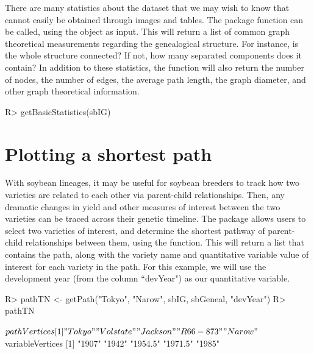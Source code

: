 \documentclass[article,shortnames]{jss}
\begin{document}
There are many statistics about the  dataset that we may wish to know that cannot easily be obtained through images and tables. The package function  can be called, using the  object as input. This will return a list of common graph theoretical measurements regarding the genealogical structure. For instance, is the whole structure connected? If not, how many separated components does it contain? In addition to these statistics, the  function will also return the number of nodes, the number of edges, the average path length, the graph diameter, and other graph theoretical information.

\begin{CodeChunk}
\begin{CodeInput}
R> getBasicStatistics(sbIG)
\end{CodeInput}
\end{CodeChunk}

\section{Plotting a shortest path}
\label{psp}

With soybean lineages, it may be useful for soybean breeders to track how two varieties are related to each other via parent-child relationships. Then, any dramatic changes in yield and other measures of interest between the two varieties can be traced across their genetic timeline. The  package allows users to select two varieties of interest, and determine the shortest pathway of parent-child relationships between them, using the  function. This will return a list that contains the path, along with the variety name and quantitative variable value of interest for each variety in the path. For this example, we will use the development year (from the column ``devYear") as our quantitative variable.

\begin{CodeChunk}
\begin{CodeInput}
R> pathTN <- getPath("Tokyo", "Narow", sbIG, sbGeneal, "devYear")
R> pathTN
\end{CodeInput}
\begin{CodeOutput}
$pathVertices
[1] "Tokyo"    "Volstate" "Jackson"  "R66-873"  "Narow"   
$variableVertices
[1] "1907"   "1942"   "1954.5" "1971.5" "1985"   
\end{CodeOutput}
\end{CodeChunk}
\end{document}
